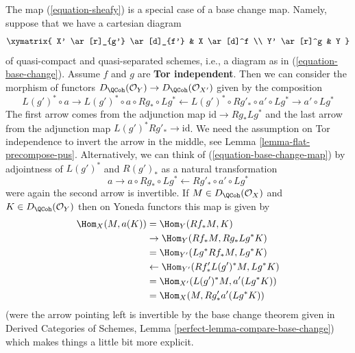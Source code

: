 \noindent
The map (\ref{equation-sheafy}) is a special case of a base change map.
Namely, suppose that we have a cartesian diagram
$$
\xymatrix{
X' \ar[r]_{g'} \ar[d]_{f'} & X \ar[d]^f \\
Y' \ar[r]^g & Y
}
$$
of quasi-compact and quasi-separated schemes, i.e., a diagram as in
(\ref{equation-base-change}). Assume $f$ and $g$ are {\bf Tor independent}.
Then we can consider the morphism of functors
$D_\QCoh(\mathcal{O}_Y) \to D_\QCoh(\mathcal{O}_{X'})$
given by the composition
\begin{equation}
\label{equation-base-change-map}
L(g')^* \circ a \to
L(g')^* \circ a \circ Rg_* \circ Lg^* \leftarrow
L(g')^* \circ Rg'_* \circ a' \circ Lg^* \to a' \circ Lg^*
\end{equation}
The first arrow comes from the adjunction map $\text{id} \to Rg_* Lg^*$
and the last arrow from the adjunction map $L(g')^*Rg'_* \to \text{id}$.
We need the assumption on Tor independence to invert the arrow
in the middle, see Lemma \ref{lemma-flat-precompose-pus}.
Alternatively, we can think of (\ref{equation-base-change-map}) by
adjointness of $L(g')^*$ and $R(g')_*$ as a natural transformation
$$
a \to a \circ Rg_* \circ Lg^* \leftarrow Rg'_* \circ a' \circ Lg^*
$$
were again the second arrow is invertible. If $M \in D_\QCoh(\mathcal{O}_X)$
and $K \in D_\QCoh(\mathcal{O}_Y)$
then on Yoneda functors this map is given by
\begin{align*}
\Hom_X(M, a(K))
& =
\Hom_Y(Rf_*M, K) \\
& \to
\Hom_Y(Rf_*M, Rg_* Lg^*K) \\
& =
\Hom_{Y'}(Lg^*Rf_*M, Lg^*K) \\
& \leftarrow
\Hom_{Y'}(Rf'_* L(g')^*M, Lg^*K) \\
& =
\Hom_{X'}(L(g')^*M, a'(Lg^*K)) \\
& =
\Hom_X(M, Rg'_*a'(Lg^*K))
\end{align*}
(were the arrow pointing left is invertible by the base
change theorem given in
Derived Categories of Schemes, Lemma \ref{perfect-lemma-compare-base-change})
which makes things a little bit more explicit.